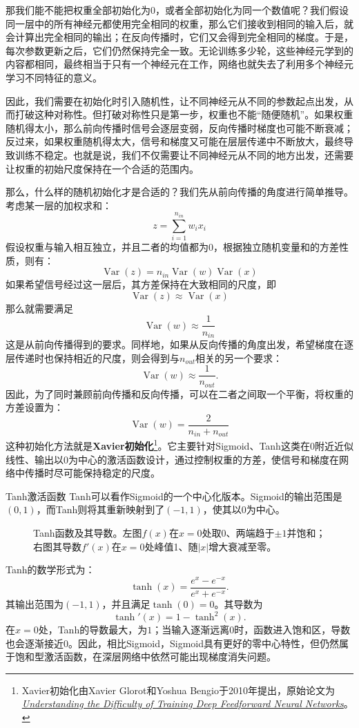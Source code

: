 那我们能不能把权重全部初始化为$0$，或者全部初始化为同一个数值呢？我们假设同一层中的所有神经元都使用完全相同的权重，那么它们接收到相同的输入后，就会计算出完全相同的输出；在反向传播时，它们又会得到完全相同的梯度。于是，每次参数更新之后，它们仍然保持完全一致。无论训练多少轮，这些神经元学到的内容都相同，最终相当于只有一个神经元在工作，网络也就失去了利用多个神经元学习不同特征的意义。

因此，我们需要在初始化时引入随机性，让不同神经元从不同的参数起点出发，从而打破这种对称性。但打破对称性只是第一步，权重也不能“随便随机”。如果权重随机得太小，那么前向传播时信号会逐层变弱，反向传播时梯度也可能不断衰减；反过来，如果权重随机得太大，信号和梯度又可能在层层传递中不断放大，最终导致训练不稳定。也就是说，我们不仅需要让不同神经元从不同的地方出发，还需要让权重的初始尺度保持在一个合适的范围内。

那么，什么样的随机初始化才是合适的？我们先从前向传播的角度进行简单推导。考虑某一层的加权求和：
$$
z=\sum_{i=1}^{n_{in}}w_ix_i
$$
假设权重与输入相互独立，并且二者的均值都为$0$，根据独立随机变量和的方差性质，则有：
$$
\operatorname{Var}(z) = n_{in}\operatorname{Var}(w)\operatorname{Var}(x)
$$
如果希望信号经过这一层后，其方差保持在大致相同的尺度，即
$$
\operatorname{Var}(z)\approx\operatorname{Var}(x)
$$
那么就需要满足
$$
\operatorname{Var}(w)\approx\frac{1}{n_{in}}
$$
这是从前向传播得到的要求。同样地，如果从反向传播的角度出发，希望梯度在逐层传递时也保持相近的尺度，则会得到与$n_{out}$相关的另一个要求：
$$
\operatorname{Var}(w)\approx\frac{1}{n_{out}}.
$$
因此，为了同时兼顾前向传播和反向传播，可以在二者之间取一个平衡，将权重的方差设置为：
$$
\operatorname{Var}(w)=\frac{2}{n_{in}+n_{out}}
$$
这种初始化方法就是\textbf{Xavier初始化}\footnote{Xavier初始化由Xavier Glorot和Yoshua Bengio于2010年提出，原始论文为\href{https://proceedings.mlr.press/v9/glorot10a/glorot10a.pdf?ref=blog.kusho.ai}{\textit{Understanding the Difficulty of Training Deep Feedforward Neural Networks}}。}。它主要针对Sigmoid、Tanh这类在$0$附近近似线性、输出以$0$为中心的激活函数设计，通过控制权重的方差，使信号和梯度在网络中传播时尽可能保持稳定的尺度。

\begin{orangeBox}{Tanh激活函数}
Tanh可以看作Sigmoid的一个中心化版本。Sigmoid的输出范围是$(0,1)$，而Tanh则将其重新映射到了$(-1,1)$，使其以$0$为中心。

\begin{figure}[H]
    \caption{Tanh函数及其导数。左图$f(x)$在$x=0$处取0、两端趋于$\pm 1$并饱和；右图其导数$f'(x)$在$x=0$处峰值1、随$|x|$增大衰减至零。}
    \label{fig:tanh}
\end{figure}

Tanh的数学形式为：
$$
\tanh(x)=\frac{e^x-e^{-x}}{e^x+e^{-x}}.
$$
其输出范围为$(-1,1)$，并且满足$\tanh(0)=0$。其导数为
$$
\tanh'(x)=1-\tanh^2(x).
$$
在$x=0$处，Tanh的导数最大，为$1$；当输入逐渐远离$0$时，函数进入饱和区，导数也会逐渐接近$0$。因此，相比Sigmoid，Sigmoid具有更好的零中心特性，但仍然属于饱和型激活函数，在深层网络中依然可能出现梯度消失问题。
\end{orangeBox}

